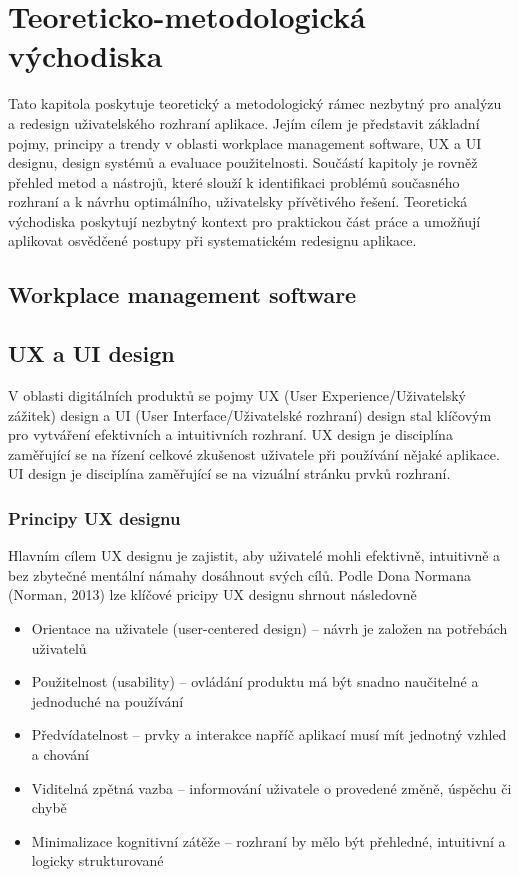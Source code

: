\chapter{Teoreticko-metodologická východiska}
Tato kapitola poskytuje teoretický a metodologický rámec nezbytný pro analýzu a redesign uživatelského rozhraní aplikace. Jejím cílem je představit základní pojmy, principy a trendy v oblasti workplace management software, UX a UI designu, design systémů a evaluace použitelnosti. Součástí kapitoly je rovněž přehled metod a nástrojů, které slouží k identifikaci problémů současného rozhraní a k návrhu optimálního, uživatelsky přívětivého řešení. Teoretická východiska poskytují nezbytný kontext pro praktickou část práce a umožňují aplikovat osvědčené postupy při systematickém redesignu aplikace.

\section{Workplace management software}

\section{UX a UI design}
V oblasti digitálních produktů se pojmy UX (User Experience/Uživatelský zážitek) design a UI (User Interface/Uživatelské rozhraní) design stal klíčovým pro vytváření efektivních a intuitivních rozhraní. UX design je disciplína zaměřující se na řízení celkové zkušenost uživatele při používání nějaké aplikace. UI design je disciplína zaměřující se na vizuální stránku prvků rozhraní.

\subsection{Principy UX designu}
Hlavním cílem UX designu je zajistit, aby uživatelé mohli efektivně, intuitivně a bez zbytečné mentální námahy dosáhnout svých cílů. Podle Dona Normana (Norman, 2013) lze klíčové pricipy UX designu shrnout následovně
\begin{itemize}
    \item Orientace na uživatele (user-centered design) – návrh je založen na potřebách uživatelů
    \item Použitelnost (usability) – ovládání produktu má být snadno naučitelné a jednoduché na používání
    \item Předvídatelnost – prvky a interakce napříč aplikací musí mít jednotný vzhled a chování
    \item Viditelná zpětná vazba – informování uživatele o provedené změně, úspěchu či chybě
    \item Minimalizace kognitivní zátěže – rozhraní by mělo být přehledné, intuitivní a logicky strukturované
\end{itemize}


